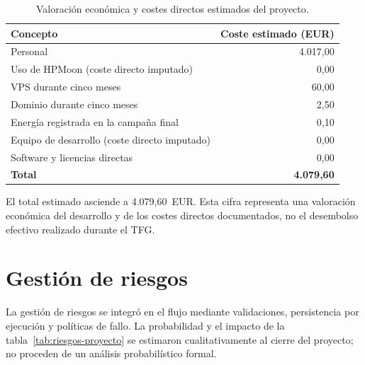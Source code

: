 \begin{table}[htbp]
    \centering
    \caption{Valoración económica y costes directos estimados del proyecto.}
    \label{tab:coste-total}
    \begin{tabular}{p{}r}
        \hline
        Concepto & Coste estimado (EUR) \\
        \hline
        Personal & 4.017,00 \\
        Uso de HPMoon (coste directo imputado) & 0,00 \\
        VPS durante cinco meses & 60,00 \\
        Dominio durante cinco meses & 2,50 \\
        Energía registrada en la campaña final & 0,10 \\
        Equipo de desarrollo (coste directo imputado) & 0,00 \\
        Software y licencias directas & 0,00 \\
        \hline
        \textbf{Total} & \textbf{4.079,60} \\
        \hline
    \end{tabular}
\end{table}

El total estimado asciende a 4.079,60~EUR. Esta cifra representa una valoración económica del desarrollo y de los costes directos documentados, no el desembolso efectivo realizado durante el TFG.

\section{Gestión de riesgos}
\label{sec:planificacion-riesgos}

La gestión de riesgos se integró en el flujo mediante validaciones, persistencia por ejecución y políticas de fallo. La probabilidad y el impacto de la tabla~\ref{tab:riesgos-proyecto} se estimaron cualitativamente al cierre del proyecto; no proceden de un análisis probabilístico formal.

